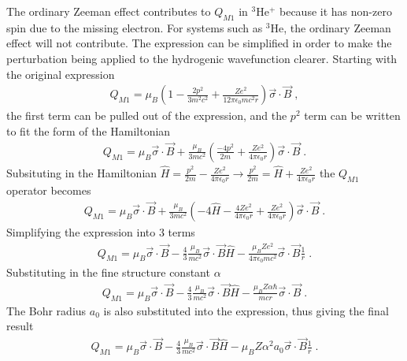             The ordinary Zeeman effect contributes to $Q_{M1}$ in $^3$He$^+$ because it has non-zero spin due to the missing electron. For systems such as $^3$He, the ordinary Zeeman effect will not contribute. The expression can be simplified in order to make the perturbation being applied to the hydrogenic wavefunction clearer. Starting with the original expression 
            \begin{align}
                Q_{M1} = \mu_B\left( 1 - \frac{2p^2}{3m^2c^2} + \frac{Ze^2}{12\pi \epsilon_0 mc^2 r} \right) \vec{\sigma} \cdot \vec{B}\;,
            \end{align}
            \noindent the first term can be pulled out of the expression, and the $p^2$ term can be written to fit the form of the Hamiltonian 
            \begin{align}
                Q_{M1} = \mu_B \vec{\sigma} \cdot \vec{B} + \frac{\mu_B}{3mc^2} \left( \frac{-4p^2}{2m} + \frac{Ze^2}{4\pi \epsilon_0 r} \right) \vec{\sigma} \cdot \vec{B}\;.
            \end{align}
            \noindent Subsituting in the Hamiltonian $\hat{H} = \frac{p^2}{2m} - \frac{Ze^2}{4\pi \epsilon_0 r} \longrightarrow \frac{p^2}{2m} = \hat{H} + \frac{Ze^2}{4\pi \epsilon_0 r}$ the $Q_{M1}$ operator becomes 
            \begin{align}
                Q_{M1} = \mu_B \vec{\sigma} \cdot \vec{B} + \frac{\mu_B}{3mc^2} \left( -4\hat{H} - \frac{4Ze^2}{4\pi \epsilon_0 r} + \frac{Ze^2}{4\pi \epsilon_0 r} \right) \vec{\sigma} \cdot \vec{B}\;.
            \end{align}
            \noindent Simplifying the expression into 3 terms 
            \begin{align}
                Q_{M1} = \mu_B \vec{\sigma} \cdot \vec{B} - \frac{4}{3}\frac{\mu_B}{mc^2}\vec{\sigma} \cdot \vec{B} \hat{H} - \frac{\mu_B Ze^2}{4\pi \epsilon_0 mc^2}\vec{\sigma} \cdot \vec{B} \frac{1}{r}\;.
            \end{align}
            \noindent Substituting in the fine structure constant $\alpha$ 
            \begin{align}
                Q_{M1} = \mu_B \vec{\sigma} \cdot \vec{B} - \frac{4}{3}\frac{\mu_B}{mc^2}\vec{\sigma} \cdot \vec{B} \hat{H} - \frac{\mu_B Z \alpha \hbar}{mcr}\vec{\sigma} \cdot \vec{B} \;.
            \end{align}
            \noindent The Bohr radius $a_0$ is also substituted into the expression, thus giving the final result
            \begin{align}
                Q_{M1} = \mu_B \vec{\sigma} \cdot \vec{B} - \frac{4}{3}\frac{\mu_B}{mc^2}\vec{\sigma} \cdot \vec{B} \hat{H} -\mu_B Z \alpha^2 a_0 \vec{\sigma} \cdot \vec{B} \frac{1}{r} \;.
            \end{align}
